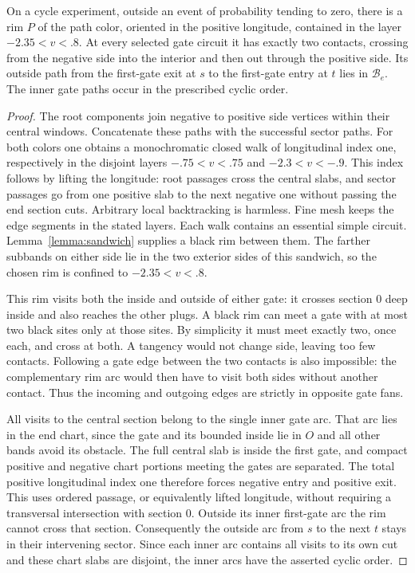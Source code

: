 \begin{lemma}\label{lemma:cycle-rim}
On a cycle experiment, outside an event of probability tending to zero,
there is a rim $P$ of the path color, oriented in the positive longitude,
contained in the layer $-2.35<v<.8$.  At every selected gate circuit it
has exactly two contacts, crossing from the negative side into the
interior and then out through the positive side.  Its outside path from
the first-gate exit at $s$ to the first-gate entry at $t$ lies in
$\mathcal B_e$.  The inner gate paths occur in the prescribed cyclic
order.
\end{lemma}

\begin{proof}
The root components join negative to positive side vertices within their
central windows.  Concatenate these paths with the successful sector
paths.  For both colors one obtains a monochromatic closed walk of
longitudinal index one, respectively in the disjoint layers
$-.75<v<.75$ and $-2.3<v<-.9$.  This index follows by lifting the
longitude: root passages cross the central slabs, and sector passages go
from one positive slab to the next negative one without passing the end
section cuts.  Arbitrary local backtracking is harmless.  Fine mesh
keeps the edge segments in the stated layers.  Each walk contains an
essential simple circuit.  Lemma~\ref{lemma:sandwich} supplies a black
rim between them.  The farther subbands on either side lie in the two
exterior sides of this sandwich, so the chosen rim is confined to
$-2.35<v<.8$.

This rim visits both the inside and outside of either gate: it crosses
section $0$ deep inside and also reaches the other plugs.  A black rim
can meet a gate with at most two black sites only at those sites.  By
simplicity it must meet exactly two, once each, and cross at both.  A
tangency would not change side, leaving too few contacts.  Following a
gate edge between the two contacts is also impossible: the complementary
rim arc would then have to visit both sides without another contact.
Thus the incoming and outgoing edges are strictly in opposite gate fans.

All visits to the central section belong to the single inner gate arc.
That arc lies in the end chart, since the gate and its bounded inside lie
in $O$ and all other bands avoid its obstacle.  The full central slab is
inside the first gate, and compact positive and negative chart portions
meeting the gates are separated.  The total positive longitudinal index
one therefore forces negative entry and positive exit.  This uses
ordered passage, or equivalently lifted longitude, without requiring a
transversal intersection with section $0$.  Outside its inner first-gate
arc the rim cannot cross that section.  Consequently the outside arc
from $s$ to the next $t$ stays in their intervening sector.  Since each
inner arc contains all visits to its own cut and these chart slabs are
disjoint, the inner arcs have the asserted cyclic order.
\end{proof}

